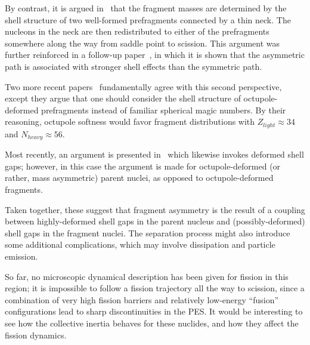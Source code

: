 By contrast, it is argued in~\cite{Warda2012a} that the fragment masses are determined by the shell structure of two well-formed prefragments connected by a thin neck. The nucleons in the neck are then redistributed to either of the prefragments somewhere along the way from saddle point to scission. This argument was further reinforced in a follow-up paper~\cite{Mcdonnell2014}, in which it is shown that the asymmetric path is associated with stronger shell effects than the symmetric path.

Two more recent papers~\cite{Scamps2018a, Scamps2019} fundamentally agree with this second perspective, except they argue that one should consider the shell structure of octupole-deformed prefragments instead of familiar spherical magic numbers. By their reasoning, octupole softness would favor fragment distributions with $Z_{light}\approx34$ and $N_{heavy}\approx56$.

Most recently, an argument is presented in~\cite{Ichikawa2019} which likewise invokes deformed shell gaps; however, in this case the argument is made for octupole-deformed (or rather, mass asymmetric) parent nuclei, as opposed to octupole-deformed fragments.

Taken together, these suggest that fragment asymmetry is the result of a coupling between highly-deformed shell gaps in the parent nucleus and (possibly-deformed) shell gaps in the fragment nuclei. The separation process might also introduce some additional complications, which may involve dissipation and particle emission.

So far, no microscopic dynamical description has been given for fission in this region; it is impossible to follow a fission trajectory all the way to scission, since a combination of very high fission barriers and relatively low-energy ``fusion'' configurations lead to sharp discontinuities in the PES. It would be interesting to see how the collective inertia behaves for these nuclides, and how they affect the fission dynamics.

